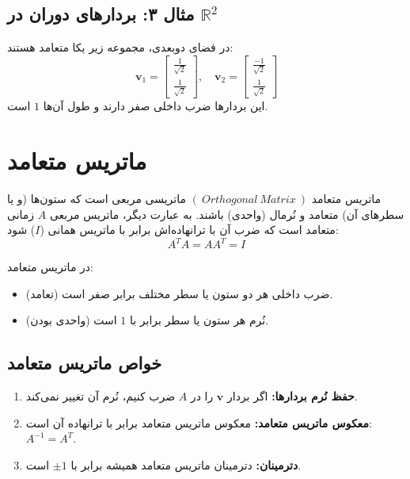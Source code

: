 \begin{example}
	\subsection*{مثال ۳: بردارهای دوران در \(\mathbb{R}^2\)}
	در فضای دو‌بعدی، مجموعه زیر یکا متعامد هستند:
	\[
	\mathbf{v}_1 = \begin{bmatrix}
		\frac{1}{\sqrt{2}} \\
		\frac{1}{\sqrt{2}}
	\end{bmatrix}, \quad
	\mathbf{v}_2 = \begin{bmatrix}
		\frac{-1}{\sqrt{2}} \\
		\frac{1}{\sqrt{2}}
	\end{bmatrix}
	\]
	این بردارها ضرب داخلی صفر دارند و طول آن‌ها \(1\) است.
\end{example}
\section{ماتریس متعامد}
\begin{definition}
	
	
	ماتریس متعامد 
	$(~Orthogonal ~Matrix~)$ 
	ماتریسی مربعی است که ستون‌ها (و یا سطرهای آن) متعامد و نُرمال (واحدی) باشند. به عبارت دیگر، ماتریس مربعی \(A\) زمانی متعامد است که ضرب آن با ترانهاده‌اش برابر با ماتریس همانی (\(I\)) شود:
	\[
	A^T A = A A^T = I
	\]
\end{definition}
در ماتریس متعامد:
\begin{itemize}
	\item ضرب داخلی هر دو ستون یا سطر مختلف برابر صفر است (تعامد).
	\item نُرم هر ستون یا سطر برابر با \(1\) است (واحدی بودن).
\end{itemize}

\subsection{خواص ماتریس متعامد}
\begin{enumerate}
	\item \textbf{حفظ نُرم بردارها:} اگر بردار \( \mathbf{v} \) را در \(A\) ضرب کنیم، نُرم آن تغییر نمی‌کند.
	\item \textbf{معکوس ماتریس متعامد:} معکوس ماتریس متعامد برابر با ترانهاده آن است: \( A^{-1} = A^T \).
	\item \textbf{دترمینان:} دترمینان ماتریس متعامد همیشه برابر با \( \pm 1 \) است.
\end{enumerate}

